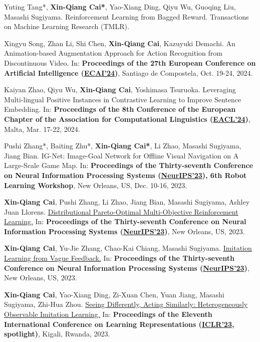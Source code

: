 \documentclass[10pt]{article}
\makeatletter
\newlength{\bibhang}
\newlength{\bibsep}
 {\@listi \global\bibsep\itemsep \global\advance\bibsep by\parsep}
\newenvironment{bibsectiond}%
        {\begin{enumerate}[labelindent=0pt,itemindent=0em,leftmargin=\bibhang,label={[\arabic*]}]{}{%
       \setlength{\itemsep}{\bibsep}%
       \setlength{\parsep}{\z@}%
        \setlength{\partopsep}{0pt}%
        \setlength{\topsep}{0pt}}}
        {\end{enumerate}\vspace{-.6\baselineskip}}
\makeatother
\begin{document}
\begin{bibsectiond}
\item Yuting Tang*, \textbf{Xin-Qiang Cai*}, Yao-Xiang Ding, Qiyu Wu, Guoqing Liu, Masashi Sugiyama. Reinforcement Learning from Bagged Reward. Transactions on Machine Learning Research (TMLR).
\item Xingyu Song, Zhan Li, Shi Chen, \textbf{Xin-Qiang Cai}, Kazuyuki Demachi. An Animation-based Augmentation Approach for Action Recognition from Discontinuous Video. In: \textbf{Proceedings of the 27th European Conference on Artificial Intelligence (\href{https://www.ecai2024.eu/}{ECAI'24})}, Santiago de Compostela, Oct. 19-24, 2024. 
\item Kaiyan Zhao, Qiyu Wu, \textbf{Xin-Qiang Cai}, Yoshimasa Tsuruoka. Leveraging Multi-lingual Positive Instances in Contrastive Learning to Improve Sentence Embedding. In: \textbf{Proceedings of the 8th Conference of the European Chapter of the Association for Computational Linguistics (\href{https://aclanthology.org/2024.eacl-long.59/}{EACL'24})}, Malta, Mar. 17-22, 2024.
\item Pushi Zhang*, Baiting Zhu*, \textbf{Xin-Qiang Cai*}, Li Zhao, Masashi Sugiyama, Jiang Bian. IG-Net: Image-Goal Network for Offline Visual Navigation on A Large-Scale Game Map. In: \textbf{Proceedings of the Thirty-seventh Conference on Neural Information Processing Systems (\href{https://openreview.net/group?id=NeurIPS.cc/2023/Conference}{NeurIPS'23}), 6th Robot Learning Workshop}, New Orleans, US, Dec. 10-16, 2023.
\item  \textbf{Xin-Qiang Cai}, Pushi Zhang, Li Zhao, Jiang Bian, Masashi Sugiyama, Ashley Juan Llorens. \href{https://neurips.cc/virtual/2023/poster/70393}{Distributional Pareto-Optimal Multi-Objective Reinforcement Learning.} In: \textbf{Proceedings of the Thirty-seventh Conference on Neural Information Processing Systems (\href{https://openreview.net/group?id=NeurIPS.cc/2023/Conference}{NeurIPS'23})}, New Orleans, US, 2023.

\item  \textbf{Xin-Qiang Cai}, Yu-Jie Zhang, Chao-Kai Chiang, Masashi Sugiyama. \href{https://neurips.cc/virtual/2023/poster/72411}{Imitation Learning from Vague Feedback.} In: \textbf{Proceedings of the Thirty-seventh Conference on Neural Information Processing Systems (\href{https://openreview.net/group?id=NeurIPS.cc/2023/Conference}{NeurIPS'23})}, New Orleans, US, 2023.

\item  \textbf{Xin-Qiang Cai}, Yao-Xiang Ding, Zi-Xuan Chen, Yuan Jiang, Masashi Sugiyama, Zhi-Hua Zhou. \href{https://openreview.net/forum?id=3ULaIHxn9u7}{Seeing Differently, Acting Similarly: Heterogeneously Observable Imitation Learning.} In: \textbf{Proceedings of the Eleventh International Conference on Learning Representations (\href{http://icdm2019.bigke.org/}{ICLR'23}, spotlight)}, Kigali, Rwanda, 2023.


\end{bibsectiond}
\end{document}

